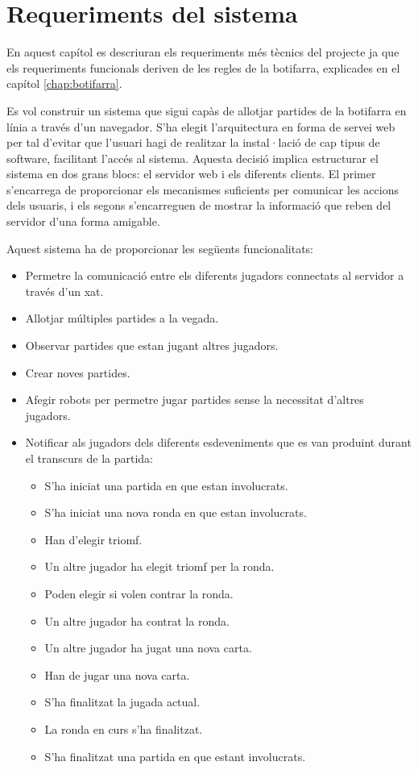

\chapter{Requeriments del sistema}
\label{chap:requeriments}

En aquest capítol es descriuran els requeriments més tècnics del projecte ja que els requeriments funcionals  deriven de les regles  de la botifarra, explicades en el capítol \ref{chap:botifarra}.

Es vol construir un sistema que sigui capàs de allotjar partides de la botifarra en línia a través d'un navegador. S'ha elegit l'arquitectura en forma de servei web per tal d'evitar que l'usuari hagi de realitzar la instal·lació de cap tipus de software, facilitant l'accés al sistema. Aquesta decisió implica estructurar el sistema en dos grans blocs: el servidor web i els diferents clients. El primer s'encarrega de proporcionar els mecanismes suficients per comunicar les accions dels usuaris, i els segons s'encarreguen de mostrar la informació que reben del servidor d'una forma amigable. 

Aquest sistema ha de proporcionar les següents funcionalitats: 

\begin{itemize}
\item{Permetre la comunicació entre els diferents jugadors connectats al servidor a través d'un xat.}
\item{Allotjar múltiples partides a la vegada.}
\item{Observar partides que estan jugant altres jugadors.}
\item{Crear noves partides.}
\item{Afegir robots per permetre jugar partides sense la necessitat d'altres jugadors.}
\item{
    Notificar als jugadors dels diferents esdeveniments que es van produint durant el transcurs de la partida:
    \begin{itemize}
        \item{S'ha iniciat una partida en que estan involucrats.}
        \item{S'ha iniciat una nova ronda en que estan involucrats.}
        \item{Han d'elegir triomf.}
        \item{Un altre jugador ha elegit triomf per la ronda.}
        \item{Poden elegir si volen contrar la ronda.}
        \item{Un altre jugador ha contrat la ronda.}
        \item{Un altre jugador ha jugat una nova carta.}
        \item{Han de jugar una nova carta.}
        \item{S'ha finalitzat la jugada actual.}
        \item{La ronda en curs s'ha finalitzat.}
        \item{S'ha finalitzat una partida en que estant involucrats.}
    \end{itemize}
}
\end{itemize}

